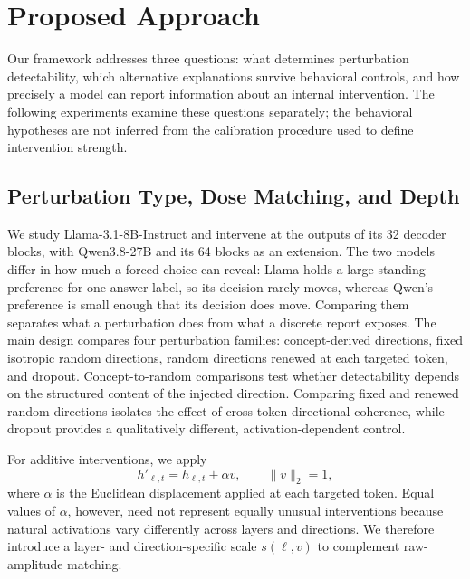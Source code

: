 \section{Proposed Approach}
\label{sec:proposal}
Our framework addresses three questions: what determines perturbation
detectability, which alternative explanations survive behavioral controls,
and how precisely a model can report information about an internal
intervention. The following experiments examine these questions separately;
the behavioral hypotheses are not inferred from the calibration procedure
used to define intervention strength.

\subsection{Perturbation Type, Dose Matching, and Depth}
\label{sec:localization-approach}

We study Llama-3.1-8B-Instruct and intervene at the outputs of its 32 decoder
blocks, with Qwen3.8-27B and its 64 blocks as an extension. The two models
differ in how much a forced choice can reveal: Llama holds a large standing
preference for one answer label, so its decision rarely moves, whereas Qwen's
preference is small enough that its decision does move. Comparing them
separates what a perturbation does from what a discrete report exposes. The main design compares four perturbation families: concept-derived
directions, fixed isotropic random directions, random directions renewed at
each targeted token, and dropout. Concept-to-random comparisons test whether
detectability depends on the structured content of the injected direction.
Comparing fixed and renewed random directions isolates the effect of
cross-token directional coherence, while dropout provides a qualitatively
different, activation-dependent control.

For additive interventions, we apply
\begin{equation}
h'_{\ell,t}=h_{\ell,t}+\alpha v,
\qquad
\|v\|_2=1,
\label{eq:intervention}
\end{equation}
where $\alpha$ is the Euclidean displacement applied at each targeted token.
Equal values of $\alpha$, however, need not represent equally unusual
interventions because natural activations vary differently across layers
and directions. We therefore introduce a layer- and direction-specific
scale $s(\ell,v)$ to complement raw-amplitude matching.


